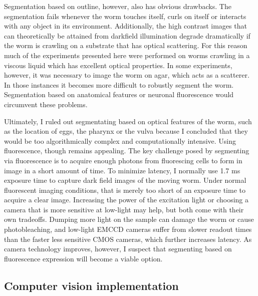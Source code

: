 	Segmentation based on outline, however, also has obvious drawbacks. The segmentation fails whenever the worm touches itself, curls on itself or interacts with any object in its environment. Additionally, the high contrast images that can theoretically be attained from darkfield illumination degrade dramatically if the worm is crawling on a substrate that has optical scattering. For this reason much of the experiments presented here were performed on worms crawling in a viscous liquid  which has excellent optical properties.  In some experiments, however, it was necessary to image the worm on agar, which acts as a scatterer. In those instances it becomes more difficult to robustly segment the worm. Segmentation based on anatomical features or neuronal fluorescence would circumvent these problems. 
	
	Ultimately, I ruled out segmentating based on optical features of the worm, such as the location of eggs, the pharynx or the vulva because I concluded that they would be too algorithmically complex and computationally intensive. Using fluorescence, though remains appealing. The key challenge posed by segmenting via fluorescence is to acquire enough photons from fluorescing cells to form in image in a short amount of time. To minimize latency, I normally use 1.7 ms exposure time to capture dark field images of the moving worm. Under normal fluorescent imaging conditions, that is merely too short of an exposure time to acquire a clear image. Increasing the power of the excitation light or choosing a camera that is more sensitive at low-light may help, but both come with their own tradeoffs. Dumping more light on the sample can damage the worm or cause photobleaching, and low-light EMCCD cameras suffer from slower readout times than the faster less sensitive CMOS cameras, which further increases latency. As camera technology improves, however, I suspect that segmenting based on fluorescence expression will become a viable option.
	
\subsection{Computer vision implementation}
